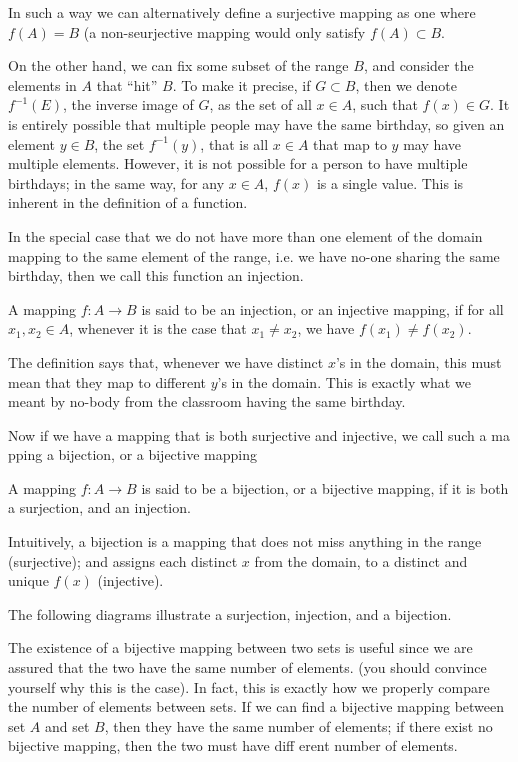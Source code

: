 \documentclass[../../templates/section]{subfiles}
\begin{document}
In such a way we can alternatively define a surjective mapping as one where
$f(A) = B$ (a non-seurjective mapping would only satisfy $f(A) \subset B$.

On the other hand, we can fix some subset of the range $B$, and consider the
elements in $A$ that ``hit'' $B$. To make it precise, if $G \subset B$, then we
denote $f^{-1}(E)$, the inverse image of $G$, as the set of all $x\in A$, such
that $f(x)\in G$. It is entirely possible that multiple people may have the
same birthday, so given an element $y\in B$, the set $f^{-1}(y)$, that is all
$x\in A$ that map to $y$ may have multiple elements. However, it is not
possible for a person to have multiple birthdays; in the same way, for any
$x\in A$, $f(x)$ is a single value. This is inherent in the definition of a
function.

In the special case that we do not have more than one element of the domain 
mapping to the same element of the range, i.e. we have no-one sharing the same
birthday, then we call this function an injection.

\begin{definition}
A mapping $f:A\rightarrow B$ is said to be an injection, or an injective
mapping, if for all $x_1, x_2 \in A$, whenever it is the case that $x_1\neq
x_2$, we have $f(x_1) \neq f(x_2)$.
\end{definition}

The definition says that, whenever we have distinct $x$'s in the domain, this
must mean that they map to different $y$'s in the domain. This is exactly what
we meant by no-body from the classroom having the same birthday.

Now if we have a mapping that is both surjective and injective, we call such a
ma pping a bijection, or a bijective mapping

\begin{definition}
A mapping $f:A\rightarrow B$ is said to be a bijection, or a bijective mapping,
if it is both a surjection, and an injection.
\end{definition} 

Intuitively, a bijection is a mapping that does not miss anything in the range
(surjective); and assigns each distinct $x$ from the domain, to a distinct and
unique $f(x)$ (injective). 

The following diagrams illustrate a surjection, injection, and a bijection.

The existence of a bijective mapping between two sets is useful since we are
assured that the two have the same number of elements.  (you should convince
yourself why this is the case). In fact, this is exactly how we properly
compare the number of elements between sets. If we can find a bijective mapping
between set $A$ and set $B$, then they have the same number of elements; if
there exist no bijective mapping, then the two must have diff erent number of
elements. 
\end{document}
